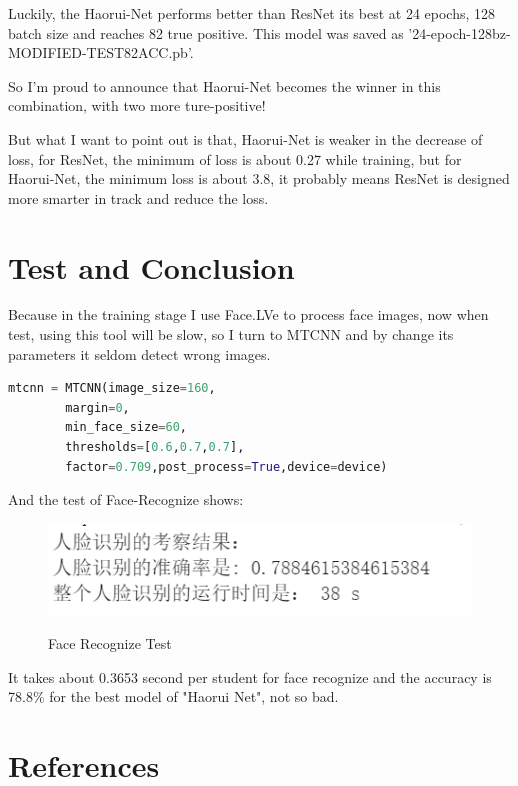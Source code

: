 \documentclass{article}
\begin{document}
Luckily, the Haorui-Net performs better than ResNet its best at 24 epochs, 128 batch size and reaches 82 true positive. This model was saved as  '24-epoch-128bz-MODIFIED-TEST82ACC.pb'.

So I'm proud to announce that Haorui-Net becomes the winner in this combination, with two more ture-positive!

But what I want to point out is that, Haorui-Net is weaker in the decrease of loss, for ResNet, the minimum of loss is about 0.27 while training, but for Haorui-Net, the minimum loss is about 3.8, it probably means ResNet is designed more smarter in track and reduce the loss.

\section{Test and Conclusion}
Because in the training stage I use Face.LVe to process face images, now when test, using this tool will be slow, so I turn to MTCNN and by change its parameters it seldom detect wrong images.
\begin{lstlisting}[language=Python, caption=MTCNN Parameter]
mtcnn = MTCNN(image_size=160, 
        margin=0,
        min_face_size=60,
        thresholds=[0.6,0.7,0.7],
        factor=0.709,post_process=True,device=device)
\end{lstlisting}
And the test of Face-Recognize shows:
\begin{figure}[H]%
  \centering
  \caption{Face Recognize Test}
  \includegraphics[width=50ex]{IMG/人脸识别测试.png} %
  \label{Fig.RNN} %
\end{figure}
It takes about 0.3653 second per student for face recognize and the accuracy is 78.8$\%$ for the best model of "Haorui Net", not so bad.



\section*{References}
\end{document}
